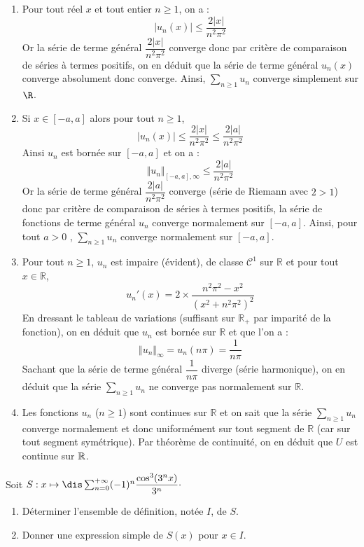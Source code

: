 \documentclass[a4paper,10pt]{report}
\newcommand{\Sum}[2]{\ensuremath{\textstyle{\sum\limits_{#1}^{#2}}}}
\begin{document}
\corr \begin{enumerate}
\item Pour tout réel $x$ et tout entier $n \geq 1$, on a :
$$\left| u_{n}\left( x\right) \right| \leq 
\frac{2\left| x\right| }{n^{2}\pi ^{2}}$$
Or la s\'{e}rie de terme g\'{e}n\'{e}ral $\dfrac{2\left| x\right| }{n^{2}\pi ^{2}}$ converge donc par critère de comparaison de séries à termes positifs, on en déduit que la série de terme général $u_{n}\left( x\right) $ converge absolument donc converge. Ainsi, $\Sum{n \geq 1}{} u_n$ converge simplement sur $\R$.
\item Si $x\in \left[ -a,a\right] $ alors pour tout $n \geq 1$, 
$$\left| u_{n}\left( x\right) \right| \leq \frac{2\left| x\right| }{n^{2}\pi ^{2}}\leq \frac{2\left|
a\right| }{n^{2}\pi ^{2}}$$
Ainsi $u_n$ est bornée sur $[-a,a]$ et on a :
$$ \Vert u_n \Vert_{[-a,a], \infty} \leq  \frac{2\left|a\right| }{n^{2}\pi ^{2}}$$
Or la s\'{e}rie de terme g\'{e}n\'{e}ral $\dfrac{2\left| a\right| }{n^{2}\pi ^{2}}$ converge (série de Riemann avec $2>1$) donc par critère de comparaison de séries à termes positifs, la série de fonctions de terme général $u_n$ converge normalement sur $[-a,a]$. Ainsi, pour tout $a > 0$ , $\Sum{n \geq 1}{} u_n$ converge normalement sur $[-a,a]$.
\item Pour tout $n \geq 1$, $u_n$ est impaire (évident), de classe $\mathcal{C}^1$ sur $\mathbb{R}$ et pour tout $x \in \mathbb{R}$,
$$u_n'(x) = 2 \times \frac{n^2\pi^2-x^2}{(x^2+n^2 \pi^2)^2}$$
En dressant le tableau de variations (suffisant sur $\mathbb{R}_+$ par imparité de la fonction), on en déduit que $u_n$ est bornée sur $\mathbb{R}$ et que l'on a :
$$ \Vert u_n \Vert_{\infty} = u_n( n \pi) = \frac{1}{n \pi}$$
Sachant que la série de terme général $\dfrac{1}{n\pi}$ diverge (série harmonique), on en déduit que la s\'{e}rie $\Sum{n \geq 1}{} u_{n}$ ne converge pas normalement sur $\mathbb{R}$.
\item Les fonctions $u_{n}$ ($n \geq 1$) sont continues sur $\mathbb{R}$ et on sait que la s\'{e}rie $\Sum{n \geq 1}{} u_{n}$ converge normalement et donc uniformément sur tout segment de $\mathbb{R}$ (car sur tout segment symétrique). Par théorème de continuité, on en déduit que $U$ est continue sur $\Bbb{R}$.
\end{enumerate}

\begin{Exercice}{} Soit $S : x \mapsto \dis \sum_{n=0}^{+ \infty}  (-1)^n \dfrac{\cos^3(3^nx)}{3^n} \cdot$

\begin{enumerate}
\item Déterminer l'ensemble de définition, notée $I$, de $S$.
\item Donner une expression simple de $S(x)$ pour $x \in I$.
\end{enumerate}
\end{Exercice}
\end{document}
